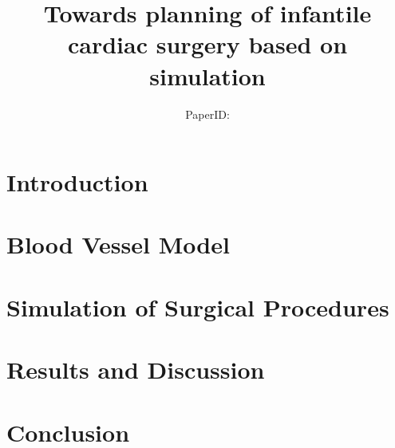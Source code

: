 \documentclass[runningheads,a4paper]{llncs}
\begin{document}
\mainmatter            %

\title{Towards planning of infantile cardiac surgery based on simulation}

\author{PaperID:} %

\maketitle

\begin{abstract}
\end{abstract}

\section{Introduction}
 

\section{Blood Vessel Model}


\section{Simulation of Surgical Procedures}


\section{Results and Discussion}


\section{Conclusion}

\end{document}
